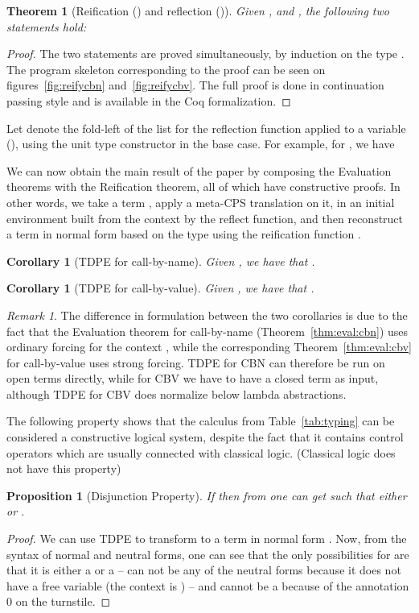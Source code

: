 \documentclass{eptcs}
\theoremstyle{definition}
\theoremstyle{plain}
\newtheorem{proposition}[definition]{Proposition}
\newtheorem{theorem}[definition]{Theorem}
\newtheorem{corollary}[definition]{Corollary}
\theoremstyle{remark}
\newtheorem{remark}[definition]{Remark}
\begin{document}
\begin{theorem}[Reification () and reflection ()] Given ,  and , the following two statements hold:
  
\end{theorem}
\begin{proof} The two statements are proved simultaneously, by induction on the type . The program skeleton corresponding to the proof can be seen on figures~\ref{fig:reifycbn} and~\ref{fig:reifycbv}. The full proof is done in continuation passing style and is available in the Coq formalization.
\end{proof}

Let  denote the fold-left of the list  for the reflection function applied to a variable (), using the unit type constructor  in the base case. For example, for , we have


We can now obtain the main result of the paper by composing the Evaluation theorems with the Reification theorem, all of which have constructive proofs. In other words, we take a term , apply a meta-CPS translation  on it, in an initial environment built from the context  by the reflect function, and then reconstruct a term in normal form based on the type  using the reification function .

\begin{corollary}[TDPE for call-by-name] Given , we have that .
\end{corollary}

\begin{corollary}[TDPE for call-by-value] Given , we have that .
\end{corollary}

\begin{remark}
The difference in formulation between the two corollaries is due to the fact that the Evaluation theorem for call-by-name (Theorem~\ref{thm:eval:cbn}) uses ordinary forcing for the context , while the corresponding Theorem~\ref{thm:eval:cbv} for call-by-value uses strong forcing. TDPE for CBN can therefore be run on open terms directly, while for CBV we have to have a closed term as input, although TDPE for CBV does normalize below lambda abstractions.
\end{remark}

The following property shows that the calculus from Table~\ref{tab:typing} can be considered a constructive logical system, despite the fact that it contains control operators which are usually connected with classical logic. (Classical logic does not have this property)
\begin{proposition}[Disjunction Property] If  then from  one can get  such that either  or .
\end{proposition}
\begin{proof}
We can use TDPE to transform  to a term in normal form . Now, from the syntax of normal and neutral forms, one can see that the only possibilities for  are that it is either a  or a  --  can not be any of the neutral forms because it does not have a free variable (the context is ) -- and  cannot be a  because of the annotation 0 on the turnstile.
\end{proof}
\end{document}
